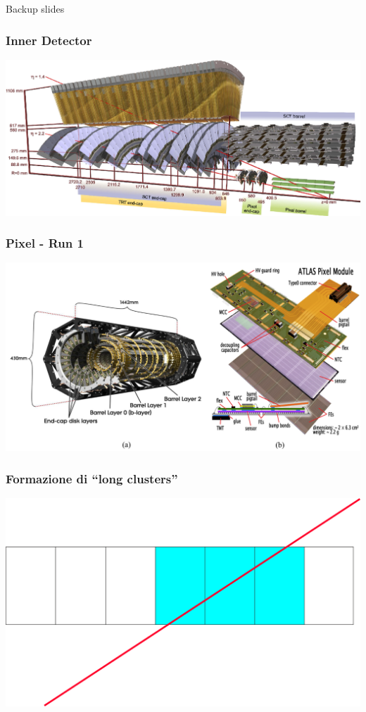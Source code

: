 \documentclass{beamer}
\begin{document}
\begin{frame}
\begin{center}
\huge{\color{dred}Backup slides}
\end{center}
\end{frame}
\begin{frame}
\frametitle{Inner Detector}
\centering
\includegraphics[width=.7\textwidth]{innerdetector_sideways_2}
\end{frame}

\begin{frame}
\frametitle{Pixel - Run 1}
\includegraphics[width=\textwidth]{Pixel_run1}
\end{frame}

\begin{frame}
\frametitle{Formazione di ``long clusters''}
\includegraphics[width=\textwidth]{long_cluster}
\end{frame}
\end{document}
